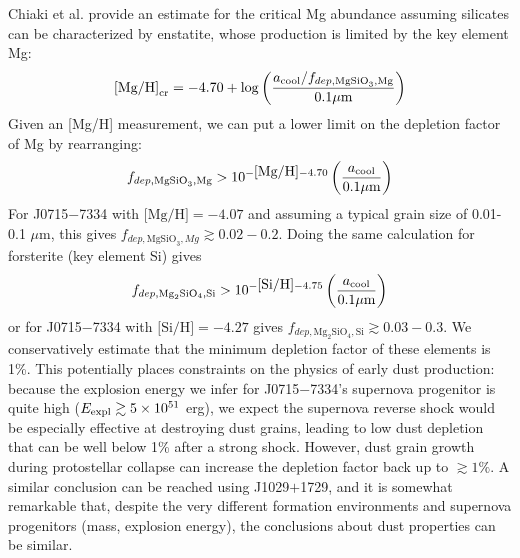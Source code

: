 \documentclass{natureprintstyle}
\newcommand{\umpstar}{J0715$-$7334\xspace}
\newcommand{\caffaustar}{J1029$+$1729\xspace}
\begin{document}
Chiaki et al.\cite{Chiaki2017} provide an estimate for the critical Mg abundance assuming silicates can be characterized by enstatite, whose production is limited by the key element Mg:
\begin{equation*}
    \textrm{[Mg/H]}_{\rm cr} = -4.70 + \log \left(\frac{a_{\rm cool}/f_{dep,\text{MgSiO}_3,\text{Mg}}}{0.1 \mu \text{m}}\right)
\end{equation*}
Given an [Mg/H] measurement, we can put a lower limit on the depletion factor of Mg by rearranging:
\begin{equation*}
    f_{dep,\text{MgSiO}_3,\text{Mg}} > 10^{-\mbox{[Mg/H]}-4.70} \left(\frac{a_{\rm cool}}{0.1\mu\text{m}}\right)
\end{equation*}
For \umpstar with $\mbox{[Mg/H]} = -4.07$ and assuming a typical grain size of 0.01-0.1 $\mu\text{m}$\cite{Nozawa2007,Schneider2012}, this gives $f_{dep,\text{MgSiO}_3,Mg} \gtrsim 0.02-0.2$.
Doing the same calculation for forsterite (key element Si) gives
\begin{equation*}
    f_{dep,\text{Mg}_2\text{SiO}_4,\text{Si}} > 10^{-\mbox{[Si/H]}-4.75} \left(\frac{a_{\rm cool}}{0.1\mu\text{m}}\right)
\end{equation*}
or for \umpstar with $\mbox{[Si/H]} = -4.27$ gives $f_{dep,\text{Mg}_2\text{SiO}_4,\text{Si}} \gtrsim 0.03-0.3$.
We conservatively estimate that the minimum depletion factor of these elements is 1\%.
This potentially places constraints on the physics of early dust production: because the explosion energy we infer for \umpstar's supernova progenitor is quite high ($E_{\rm expl} \gtrsim 5 \times 10^{51}$ erg), we expect the supernova reverse shock would be especially effective at destroying dust grains\cite{Bianchi2007}, leading to low dust depletion that can be well below 1\% after a strong shock\cite{Schneider2012}. However, dust grain growth during protostellar collapse can increase the depletion factor back up to ${\gtrsim}1\%$\cite{Chiaki2015}.
A similar conclusion can be reached using \caffaustar\cite{Schneider2012b,Chiaki2014}, and it is somewhat remarkable that, despite the very different formation environments and supernova progenitors (mass, explosion energy), the conclusions about dust properties can be similar.
\end{document}
